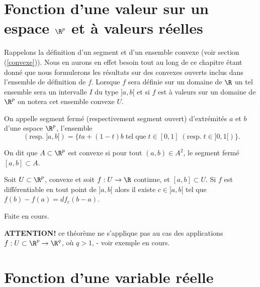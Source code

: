 \documentclass[class=report,crop=false]{standalone}
\begin{document}
  \section{Fonction  d'une valeur sur un espace $\R^p$ et \`a valeurs r\'eelles}
  Rappelons la définition d'un segment et d'un ensemble convexe (voir section (\ref{convexe})). Nous en aurons en effet besoin tout au long de ce chapitre étant donné que nous formulerons les résultats sur des convexes ouverts inclus dans l'ensemble de définition de $f$. Lorsque $f$ sera définie sur un domaine de $\R$ un tel ensemble sera un intervalle $I$ du type $]a,b[$ et si $f$ est à valeurs sur un domaine de $\R^p$ on notera cet ensemble convexe $U$.
  \begin{definition}[SEGMENT]
\textcolor[rgb]{0.98,0.00,0.00}{ 
   On appelle segment ferm\'e (respectivement segment ouvert) d'extr\'emit\'es $a$ et $b$ d'une espace $\R^p$, l'ensemble
  \begin{equation*}
  [a,b] \;(\mathrm{resp.}\; ]a,b[)=\{ta+(1-t)b \;\mathrm{tel \;que\;} t\in[0,1]\;(\mathrm{resp.}\;t\in ]0,1[)\}.
  \end{equation*}}
  \end{definition}

 \begin{definition}
\textcolor[rgb]{0.98,0.00,0.00}{
  On dit que $A \subset \R^p$ est convexe si pour tout $(a,b) \in A^2$, le segment ferm\'e $[a,b] \subset A$.}
\end{definition}

 \begin{theoreme}
\textcolor[rgb]{0.44,0.00,0.87}{
   Soit $U \subset \R^p$, convexe et soit $f:U \rightarrow \R$ continue, et $[a,b] \subset U$. Si $f$ est diff\'erentiable en tout point
   de $]a,b[$ alors il existe $c \in]a,b[$ tel que $f(b)-f(a)=df_c(b-a)$.}
 \end{theoreme}
    Faite en cours.
   
   \begin{remarque*}
  \textcolor[rgb]{0.00,0.00,1.00}{
   \textbf{ ATTENTION!} ce th\'eor\`eme ne s'applique pas au cas des applications $f:U \subset \R^p \rightarrow \R^q$, o\`u $q>1$,
    - voir exemple en cours.}
  \end{remarque*}
 \section{Fonction d'une variable r\'eelle}
 
\end{document}
